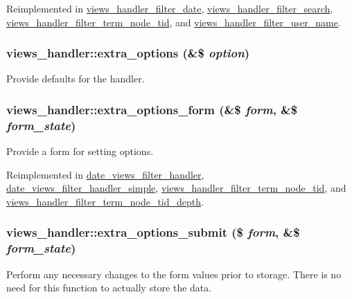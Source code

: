 Reimplemented in \hyperlink{classviews__handler__filter__date_a0146f5fd6dee328506fc6f29006eb401}{views\_\-handler\_\-filter\_\-date}, \hyperlink{classviews__handler__filter__search_a4cdb0b399fcbd1e4a5643924b706dddd}{views\_\-handler\_\-filter\_\-search}, \hyperlink{classviews__handler__filter__term__node__tid_ab0c4583fea802e86c84fabafc4768074}{views\_\-handler\_\-filter\_\-term\_\-node\_\-tid}, and \hyperlink{classviews__handler__filter__user__name_a3510a0e9b2c5fea7460a42049e0a58c0}{views\_\-handler\_\-filter\_\-user\_\-name}.\hypertarget{classviews__handler_a0299b8b2ba70379a5aca4ddb5b8d95b4}{
\subsubsection[{extra\_\-options}]{\setlength{\rightskip}{0pt plus 5cm}views\_\-handler::extra\_\-options (\&\$ {\em option})}}
\label{classviews__handler_a0299b8b2ba70379a5aca4ddb5b8d95b4}
Provide defaults for the handler. \hypertarget{classviews__handler_a0eed1d12c47d60190f59e135d962719e}{
\subsubsection[{extra\_\-options\_\-form}]{\setlength{\rightskip}{0pt plus 5cm}views\_\-handler::extra\_\-options\_\-form (\&\$ {\em form}, \/  \&\$ {\em form\_\-state})}}
\label{classviews__handler_a0eed1d12c47d60190f59e135d962719e}
Provide a form for setting options. 

Reimplemented in \hyperlink{classdate__views__filter__handler_a17b0b4b30f8c2bcb368bbb6fd9eabcd1}{date\_\-views\_\-filter\_\-handler}, \hyperlink{classdate__views__filter__handler__simple_aec14000e6f8d47bbb7c3dd0138a10c59}{date\_\-views\_\-filter\_\-handler\_\-simple}, \hyperlink{classviews__handler__filter__term__node__tid_adf599d1bef08003b1b734dfd397030a6}{views\_\-handler\_\-filter\_\-term\_\-node\_\-tid}, and \hyperlink{classviews__handler__filter__term__node__tid__depth_a704c5e42a5a41ee12bd01b1b153431e4}{views\_\-handler\_\-filter\_\-term\_\-node\_\-tid\_\-depth}.\hypertarget{classviews__handler_aca642bf4dff25e0d49f7fca65bb97f77}{
\subsubsection[{extra\_\-options\_\-submit}]{\setlength{\rightskip}{0pt plus 5cm}views\_\-handler::extra\_\-options\_\-submit (\$ {\em form}, \/  \&\$ {\em form\_\-state})}}
\label{classviews__handler_aca642bf4dff25e0d49f7fca65bb97f77}
Perform any necessary changes to the form values prior to storage. There is no need for this function to actually store the data. 

